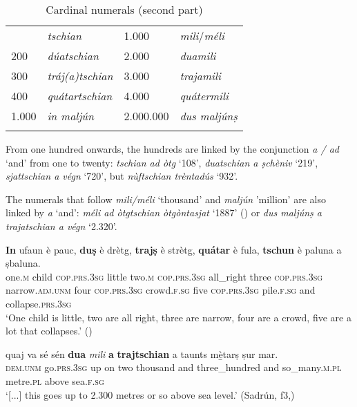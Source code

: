 \begin{table}
	\caption{Cardinal numerals (second part)} 
	\label{tab:cardnum2}
	\begin{tabular}{llll}
		\lsptoprule
		100&\textit{tschian} & 1.000 & \textit{mili}/\textit{méli}\\
		200&\textit{dúatschian} & 2.000 & \textit{duamili}\\
		300&\textit{tráj(a)tschian} & 3.000 & \textit{trajamili}\\
		400&\textit{quátartschian} & 4.000 &  \textit{quátermili}\\
		1.000 & \textit{in maljún} & 2.000.000 & \textit{dus maljúnṣ}\\
		\lspbottomrule
	\end{tabular}
\end{table}

From one hundred onwards, the hundreds are linked by the conjunction \textit{a / ad} `and' from one to twenty: \textit{tschian ad òtg} `108', \textit{duatschian a ṣchèniv} `219', \textit{sjattschian a végn} `720', but \textit{nùftschian trèntadús} `932'.

The numerals that follow \textit{mili/méli} `thousand' and \textit{maljún} 'million' are also linked by \textit{a} `and': \textit{méli ad òtgtschian òtgòntasjat} `1887' () or \textit{dus maljúnṣ a trajatschian a végn} `2.320'.

\ea

\gll  \textbf{In} ufaun è pauc, \textbf{duṣ} è drètg, \textbf{trajṣ} è strètg, \textbf{quátar} è fula, \textbf{tschun} è paluna a ṣbaluna.\\
one.\textsc{m} child \textsc{cop.prs.3sg} little two.\textsc{m} \textsc{cop.prs.3sg} all\_right three \textsc{cop.prs.3sg} narrow.\textsc{adj.unm} four \textsc{cop.prs.3sg} crowd.\textsc{f.sg} five \textsc{cop.prs.3sg} pile.\textsc{f.sg} and  collapse.\textsc{prs.3sg}\\
\glt `One child is little, two are all right, three are narrow, four are a crowd, five are a lot that collapses.' ()
\z

\ea
\gll  [...] quaj va\footnotemark{} sé sén \textbf{dua} \textit{mili} \textbf{a} \textbf{trajtschian} a taunts m{\`e̱}tarṣ ṣur mar. \\
{} \textsc{dem.unm} go.\textsc{prs.3sg} up on two thousand and three\_hundred and  so\_many.\textsc{m.pl} metre.\textsc{pl} above sea.\textsc{f.sg}\\
\glt `[...] this goes up to 2.300 metres or so above sea level.' (Sadrún, f3,)
\z


